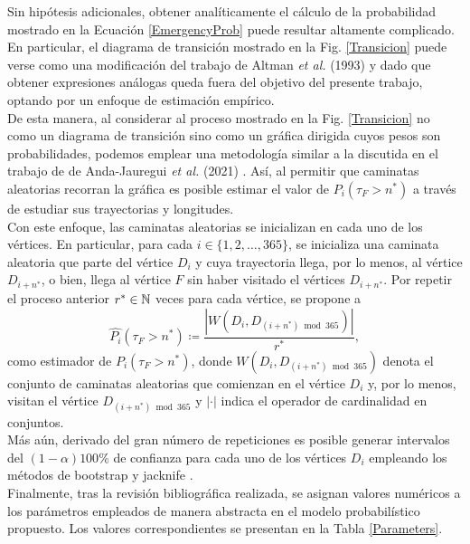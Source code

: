 Sin hipótesis adicionales, obtener analíticamente el cálculo de la probabilidad mostrado en la Ecuación \eqref{EmergencyProb} puede resultar altamente complicado. En particular, el diagrama de transición mostrado en la Fig. \ref{Transicion} puede verse como una modificación del trabajo de Altman \textit{et al.} (1993) \cite{Altman_1993} y dado que obtener expresiones análogas queda fuera del objetivo del presente trabajo, optando por un enfoque de estimación empírico.\\


De esta manera, al considerar al proceso mostrado en la Fig. \ref{Transicion} no como un diagrama de transición sino como un gráfica dirigida cuyos pesos son probabilidades, podemos emplear una metodología similar a la discutida en el trabajo de de Anda-Jauregui \textit{et al.} (2021) \cite{deAndaJauregui_2021}. Así, al permitir que caminatas aleatorias recorran la gráfica es posible estimar el valor de $P_{i}(\tau_F>n^*)$ a través de estudiar sus trayectorias y longitudes.\\

Con este enfoque, las caminatas aleatorias se inicializan en cada uno de los vértices. En particular, para cada $i\in \{1,2,\ldots,365\}$, se inicializa una caminata aleatoria que parte del vértice $D_i$ y cuya trayectoria llega, por lo menos, al vértice $D_{i+n^*}$, o bien, llega al vértice $F$ sin haber visitado el vértices $D_{i+n^*}$. Por repetir el proceso anterior $r^*\in \mathbb{N}$ veces para cada vértice, se propone a \begin{equation}
\widehat{P_{i}}(\tau_F>n^*)\coloneq \frac{|W(D_{i}, D_{(i+n^*)\bmod{365}})|}{r^*},
\end{equation} como estimador de $P_{i}(\tau_F>n^*)$, donde $W(D_{i}, D_{(i+n^*)\bmod{365}})$ denota el conjunto de caminatas aleatorias que comienzan en el vértice $D_{i}$ y, por lo menos, visitan el vértice $D_{(i+n^*)\bmod{365}}$ y $|\cdot|$ indica el operador de cardinalidad en conjuntos.\\

Más aún, derivado del gran número de repeticiones es posible generar intervalos del $(1-\alpha)100\%$ de confianza para cada uno de los vértices $D_i$ empleando los métodos de bootstrap y jacknife \cite[Capítulo 13]{Ramachandran_2009}.\\

Finalmente, tras la revisión bibliográfica realizada, se asignan valores numéricos a los parámetros empleados de manera abstracta en el modelo probabilístico propuesto. Los valores correspondientes se presentan en la Tabla \ref{Parameters}.\\ 

